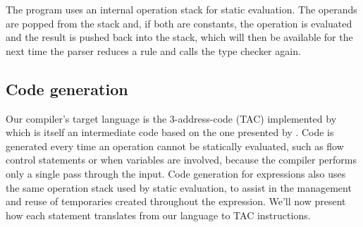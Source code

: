 The program uses an internal operation stack for static evaluation.
The operands are popped from the stack and, if both are constants,
the operation is evaluated and the result is pushed back into the
stack, which will then be available for the next time the parser
reduces a rule and calls the type checker again.

\subsection{Code generation}
\label{section:codegen}
Our compiler's target language is the 3-address-code (TAC) implemented by
\textcite{TAC} which is itself an intermediate code based on the one
presented by \textcite{Aho2007}. Code is generated every time an
operation cannot be statically evaluated, such as flow control
statements or when variables are involved, because the compiler
performs only a single pass through the input. Code generation for expressions
also uses the same operation stack used by static evaluation, to assist in the
management and reuse of temporaries created throughout the
expression. We'll now present how each statement translates from our
language to TAC instructions. 

\vfill


